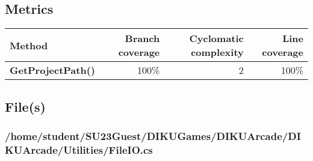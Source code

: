 \documentclass[a4paper,landscape,10pt]{article}
\begin{document}
\subsection{Metrics}
\begin{longtable}[l]{|l|r|r|r|}
\hline
\textbf{Method} & \textbf{Branch coverage} & \textbf{Cyclomatic complexity} & \textbf{Line coverage}\\
\hline
\textbf{GetProjectPath()} & 100\% & 2 & 100\%\\
\hline
\end{longtable}
\subsection{File(s)}
\subsubsection{/home/student/SU23Guest/DIKUGames/DIKUArcade/DIKUArcade/Utilities/FileIO.cs}
\end{document}
